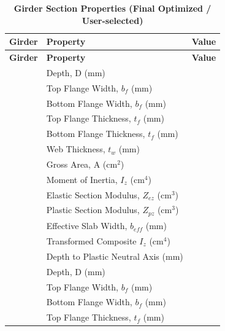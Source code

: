 \documentclass[12pt,a4paper]{report}
\numberwithin{table}{chapter}
\numberwithin{figure}{chapter}
\newcommand{\reportrowpad}{4pt}
\begin{document}
\begin{longtable}{|C{2.5cm}|L{8.0cm}|>{\centering\arraybackslash}p{5.0cm}|}
\caption{\textbf{Girder Section Properties (Final Optimized / User-selected)}}\\
\hline
\textbf{Girder} & \textbf{Property} & \textbf{Value} \\[\reportrowpad]
\hline
\endfirsthead
\hline
\textbf{Girder} & \textbf{Property} & \textbf{Value} \\[\reportrowpad]
\hline
\endhead
{} & \textnormal{Depth, D (mm)} &  \\[\reportrowpad]
 & \textnormal{Top Flange Width, $b_f$ (mm)} &  \\[\reportrowpad]
 & \textnormal{Bottom Flange Width, $b_f$ (mm)} &  \\[\reportrowpad]
 & \textnormal{Top Flange Thickness, $t_f$ (mm)} &  \\[\reportrowpad]
 & \textnormal{Bottom Flange Thickness, $t_f$ (mm)} &  \\[\reportrowpad]
 & \textnormal{Web Thickness, $t_w$ (mm)} &  \\[\reportrowpad]
 & \textnormal{Gross Area, A (cm$^2$)} &  \\[\reportrowpad]
 & \textnormal{Moment of Inertia, $I_z$ (cm$^4$)} &  \\[\reportrowpad]
 & \textnormal{Elastic Section Modulus, $Z_{ez}$ (cm$^3$)} &  \\[\reportrowpad]
 & \textnormal{Plastic Section Modulus, $Z_{pz}$ (cm$^3$)} &  \\[\reportrowpad]
 & \textnormal{Effective Slab Width, $b_{eff}$ (mm)} &  \\[\reportrowpad]
 & \textnormal{Transformed Composite $I_z$ (cm$^4$)} &  \\[\reportrowpad]
 & \textnormal{Depth to Plastic Neutral Axis (mm)} &  \\[\reportrowpad]
\hline
{} & \textnormal{Depth, D (mm)} &  \\[\reportrowpad]
 & \textnormal{Top Flange Width, $b_f$ (mm)} &  \\[\reportrowpad]
 & \textnormal{Bottom Flange Width, $b_f$ (mm)} &  \\[\reportrowpad]
 & \textnormal{Top Flange Thickness, $t_f$ (mm)} &  \\[\reportrowpad]

\end{longtable}
\end{document}
